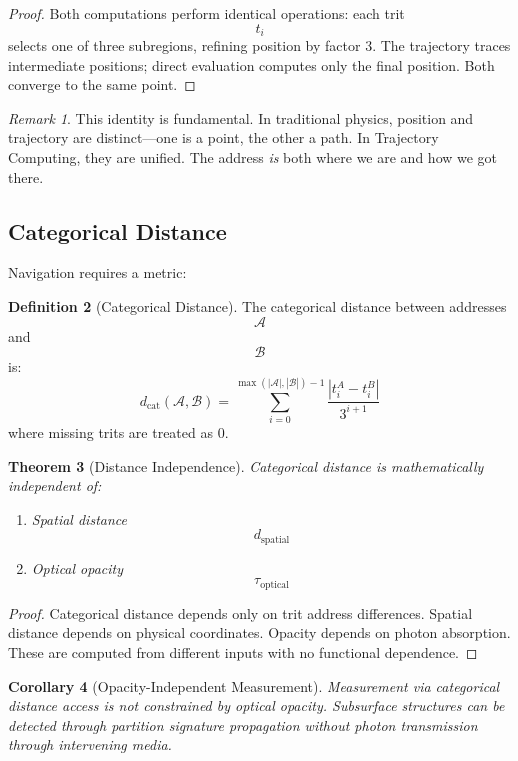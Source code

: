 \documentclass[11pt,twocolumn,a4paper]{article}
\newtheorem{theorem}{Theorem}[section]
\newtheorem{corollary}[theorem]{Corollary}
\theoremstyle{definition}
\newtheorem{definition}[theorem]{Definition}
\theoremstyle{remark}
\newtheorem{remark}[theorem]{Remark}
\begin{document}
\begin{proof}
Both computations perform identical operations: each trit $$t_i$$ selects one of three subregions, refining position by factor 3. The trajectory traces intermediate positions; direct evaluation computes only the final position. Both converge to the same point.
\end{proof}

\begin{remark}
This identity is fundamental. In traditional physics, position and trajectory are distinct---one is a point, the other a path. In Trajectory Computing, they are unified. The address \emph{is} both where we are and how we got there.
\end{remark}

\subsection{Categorical Distance}

Navigation requires a metric:

\begin{definition}[Categorical Distance]
The categorical distance between addresses $$\mathcal{A}$$ and $$\mathcal{B}$$ is:
\begin{equation}
d_{\text{cat}}(\mathcal{A}, \mathcal{B}) = \sum_{i=0}^{\max(|\mathcal{A}|, |\mathcal{B}|)-1} \frac{|t_i^A - t_i^B|}{3^{i+1}}
\end{equation}
where missing trits are treated as 0.
\end{definition}

\begin{theorem}[Distance Independence]
\label{thm:distance_independence}
Categorical distance is mathematically independent of:
\begin{enumerate}
    \item Spatial distance $$d_{\text{spatial}}$$
    \item Optical opacity $$\tau_{\text{optical}}$$
\end{enumerate}
\end{theorem}

\begin{proof}
Categorical distance depends only on trit address differences. Spatial distance depends on physical coordinates. Opacity depends on photon absorption. These are computed from different inputs with no functional dependence.
\end{proof}

\begin{corollary}[Opacity-Independent Measurement]
\label{cor:opacity}
Measurement via categorical distance access is not constrained by optical opacity. Subsurface structures can be detected through partition signature propagation without photon transmission through intervening media.
\end{corollary}
\end{document}
